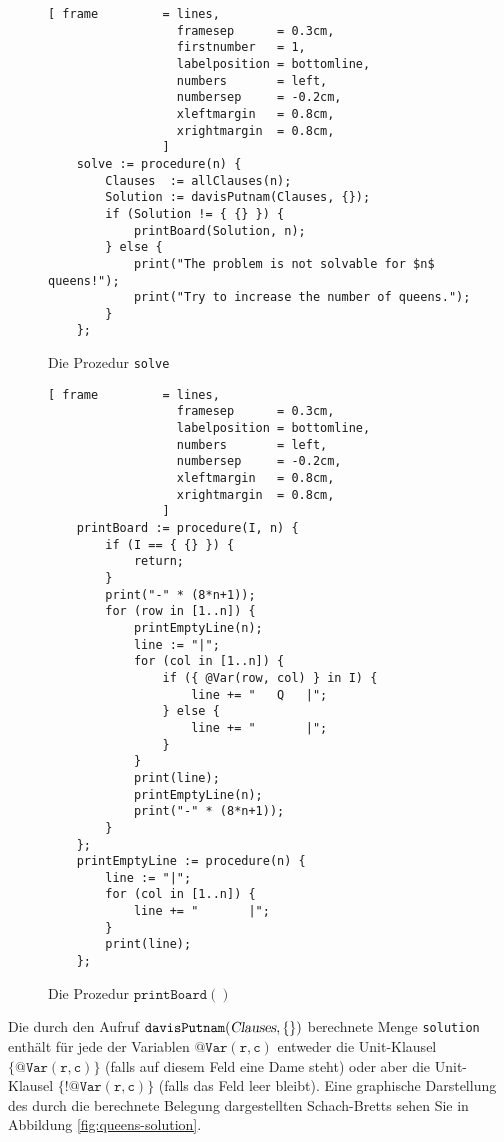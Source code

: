 \begin{figure}[!ht]
\centering
\begin{Verbatim}[ frame         = lines, 
                  framesep      = 0.3cm, 
                  firstnumber   = 1,
                  labelposition = bottomline,
                  numbers       = left,
                  numbersep     = -0.2cm,
                  xleftmargin   = 0.8cm,
                  xrightmargin  = 0.8cm,
                ]
    solve := procedure(n) {
        Clauses  := allClauses(n);
        Solution := davisPutnam(Clauses, {});
        if (Solution != { {} }) {
            printBoard(Solution, n);
        } else {
            print("The problem is not solvable for $n$ queens!");
            print("Try to increase the number of queens.");
        }
    };
\end{Verbatim}
\vspace*{-0.3cm}
\caption{Die Prozedur \texttt{solve}}
\label{fig:davisPutnam:solve}
\end{figure}


\begin{figure}[!ht]
\centering
\begin{Verbatim}[ frame         = lines, 
                  framesep      = 0.3cm, 
                  labelposition = bottomline,
                  numbers       = left,
                  numbersep     = -0.2cm,
                  xleftmargin   = 0.8cm,
                  xrightmargin  = 0.8cm,
                ]
    printBoard := procedure(I, n) {
        if (I == { {} }) {
            return;
        }
        print("-" * (8*n+1));
        for (row in [1..n]) {
            printEmptyLine(n);
            line := "|";
            for (col in [1..n]) {
                if ({ @Var(row, col) } in I) {
                    line += "   Q   |";
                } else {
                    line += "       |";
                }
            }
            print(line);
            printEmptyLine(n);
            print("-" * (8*n+1));
        }
    };
    printEmptyLine := procedure(n) {
        line := "|";
        for (col in [1..n]) {
            line += "       |";
        }
        print(line);
    };
\end{Verbatim}
\vspace*{-0.3cm}
\caption{Die Prozedur $\texttt{printBoard}()$}
\label{fig:printBoard}
\end{figure}



Die durch den Aufruf $\texttt{davisPutnam}(\textsl{Clauses}, \{\})$ 
berechnete Menge \texttt{solution} enthält für jede der Variablen $\texttt{@Var}(\texttt{r},\texttt{c})$
entweder die Unit-Klausel $\{\texttt{@Var}(\texttt{r},\texttt{c})\}$  (falls auf diesem Feld eine Dame steht) oder
aber die Unit-Klausel  $\{ \texttt{!@Var}(\texttt{r},\texttt{c})\}$ (falls das Feld leer bleibt).
Eine graphische Darstellung des durch die berechnete Belegung dargestellten Schach-Bretts
sehen Sie in Abbildung \ref{fig:queens-solution}. 

